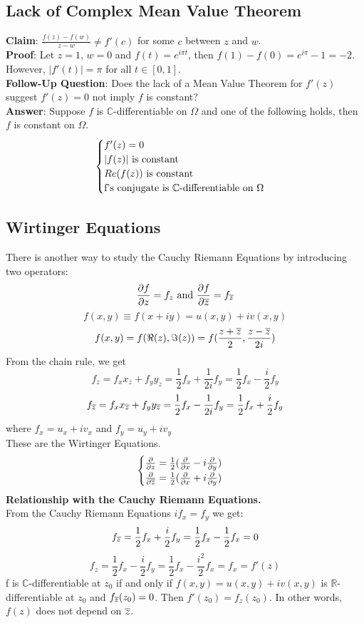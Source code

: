 \documentclass[11pt]{article}
\begin{document}
\subsection{Lack of Complex Mean Value Theorem}
\textbf{Claim}: $\frac{f(z) - f(w)}{z - w} \neq f'(c)$ for some $c$ between $z$ and $w$. \\
\textbf{Proof}: Let $z = 1$, $w = 0$ and $f(t) = e^{i\pi t}$, then $f(1) - f(0) = e^{i\pi} - 1 = -2$. However, $|f'(t)| = \pi$ for all $t \in [0, 1]$. \\
\textbf{Follow-Up Question}: Does the lack of a Mean Value Theorem for $f'(z)$ suggest $f'(z) = 0$ not imply $f$ is constant?  \\
\textbf{Answer}: Suppose $f$ is $\mathbb{C}$-differentiable on $\Omega$ and one of the following holds, then $f$ is constant on $\Omega$. 
\[ \begin{cases} 
	f'(z) = 0 \\
	|f(z)| \mbox{ is constant} \\ 
	Re(f(z)) \mbox{ is constant} \\ 
	$f$ \mbox{'s conjugate is } \mathbb{C} \mbox{-differentiable on } \Omega
   \end{cases}
\]

\subsection{Wirtinger Equations}
There is another way to study the Cauchy Riemann Equations by introducing two operators: 
\begin{equation*}
	\frac{\partial f}{\partial z} = f_z \mbox{ and } \frac{\partial f}{\partial \overline{z}} = f_{\overline{z}}
\end{equation*}
$$ f(x, y) \equiv f(x + iy) = u(x, y) + iv(x, y)$$
$$f(x, y) = f(\Re(z), \Im(z)) = f(\frac{z + \overline{z}}{2}, \frac{z - \overline{z}}{2i})$$
From the chain rule, we get 
$$f_z = f_xx_z + f_yy_z = \frac{1}{2}f_x + \frac{1}{2i}f_y = \frac{1}{2}f_x - \frac{i}{2}f_y$$
$$f_{\overline{z}} = f_xx_{\overline{z}} + f_yy_{\overline{z}} = \frac{1}{2}f_x - \frac{1}{2i}f_y = \frac{1}{2}f_x + \frac{i}{2}f_y$$
where $f_x = u_x + iv_x $ and $f_y = u_y + iv_y$ \\
These are the Wirtinger Equations. 
\[ \begin{cases} 
	\frac{\partial}{\partial z}  = \frac{1}{2}(\frac{\partial}{\partial x} - i\frac{\partial}{\partial y}) \\ 
	\frac{\partial}{\partial \overline{z}}  = \frac{1}{2}(\frac{\partial}{\partial x} + i\frac{\partial}{\partial y})
   \end{cases}
\]
\newline
\textbf{Relationship with the Cauchy Riemann Equations.}\\
From the Cauchy Riemann Equations $if_x = f_y$ we get:
$$f_{\overline{z}} = \frac{1}{2}f_x + \frac{i}{2}f_y = \frac{1}{2}f_x - \frac{1}{2}f_x = 0$$
$$f_z = \frac{1}{2}f_x - \frac{i}{2}f_y = \frac{1}{2}f_x - \frac{i^2}{2}f_x = f_x = f'(z)$$
f is $\mathbb{C}$-differentiable at $z_0$ if and only if $f(x, y) = u(x, y) + iv(x, y)$ is $\mathbb{R}$-differentiable at $z_0$ and $f_{\overline{z}}(z_0) = 0$. Then $f'(z_0) = f_z(z_0)$. In other words, $f(z)$ does not depend on $\overline{z}$. 
\end{document}
